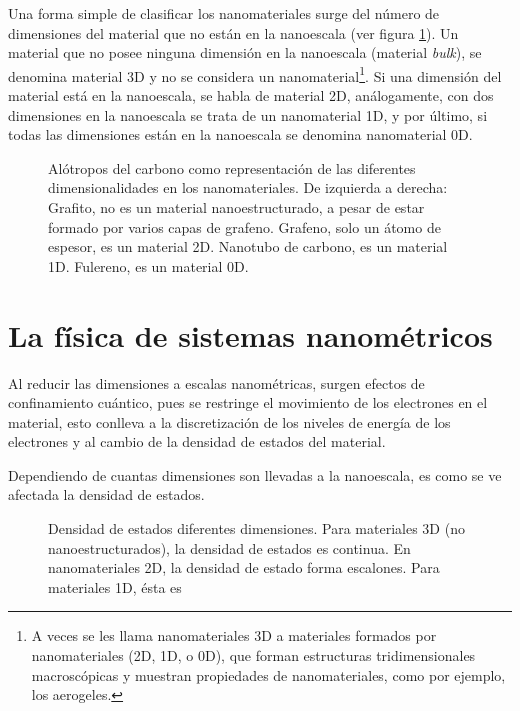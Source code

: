Una forma simple de clasificar los nanomateriales surge del número de dimensiones del material que no están en la nanoescala (ver figura \ref{fig:carbon_allotropes}). Un material que no posee ninguna dimensión en la nanoescala (material \emph{bulk}), se denomina material 3D y no  se considera un nanomaterial\footnote{A veces se les llama nanomateriales 3D a materiales formados por nanomateriales (2D, 1D, o 0D), que forman estructuras tridimensionales macroscópicas y muestran propiedades de nanomateriales, como por ejemplo, los aerogeles.}. Si una dimensión del material está en la nanoescala, se habla de material 2D, análogamente, con dos dimensiones en la nanoescala se trata de un nanomaterial 1D, y por último, si todas las dimensiones están en la nanoescala se denomina nanomaterial 0D.
\begin{figure}
	\centering
	\caption[Alótropos del carbono mostrando las diferentes dimensionalidades de los nanomateriales]{Alótropos del carbono como representación de las diferentes dimensionalidades en los nanomateriales. De izquierda a derecha: Grafito, no es un material nanoestructurado, a pesar de estar formado por varios capas de grafeno. Grafeno, solo un átomo de espesor, es un material 2D. Nanotubo de carbono, es un material 1D. Fulereno, es un material 0D.}
	\label{fig:carbon_allotropes}
\end{figure}

\section*{La física de sistemas nanométricos}


Al reducir las dimensiones a escalas nanométricas, surgen efectos de confinamiento cuántico, pues se restringe el movimiento de los electrones en el material, esto conlleva a la discretización de los niveles de energía de los electrones y al cambio de la densidad de estados del material. 



Dependiendo de cuantas dimensiones son llevadas a la nanoescala, es como se ve afectada la densidad de estados.

\begin{figure}[h!]
	\centering
	\caption[Densidad de estados en diferentes dimensionalidades]{Densidad de estados diferentes dimensiones. Para materiales 3D (no nanoestructurados), la densidad de estados es continua. En nanomateriales 2D, la densidad de estado forma escalones. Para materiales 1D, ésta es}
	\label{fig:DoE}
\end{figure}

